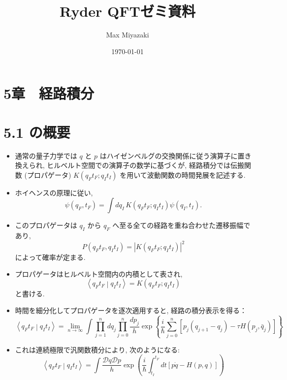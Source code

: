 \documentclass[a4paper,12pt]{article}
\title{Ryder QFTゼミ資料}
\date{\today}
\author{Max Miyazaki}
\newcommand{\braket}[2]{\left\langle #1\middle|#2\right\rangle}
\begin{document}
\maketitle
\section*{\textrm{5章　経路積分}}
\color{blue}
\section*{5.1 の概要}
\begin{itemize}
    \item 通常の量子力学では $q$ と $p$ はハイゼンベルグの交換関係に従う演算子に置き換えられ, ヒルベルト空間での演算子の数学に基づくが, 経路積分では伝搬関数 (プロパゲータ) $K(q_{F}t_{F}; q_{I}t_{I})$ を用いて波動関数の時間発展を記述する.
    \item ホイヘンスの原理に従い,
    \begin{equation*}
        \psi(q_F, t_F) = \int dq_I\, K(q_{F}t_{F}; q_{I}t_{I})\psi(q_I, t_I).
    \end{equation*}
    \item このプロパゲータは $q_I$ から $q_F$ へ至る全ての経路を重ね合わせた遷移振幅であり,
    \begin{equation*}
        P(q_{F}t_{F}, q_{I}t_{I}) = |K(q_{F}t_{F}; q_{I}t_{I})|^2
    \end{equation*}
    によって確率が定まる.
    \item プロパゲータはヒルベルト空間内の内積として表され,
    \begin{equation*}
        \braket{q_{F}t_{F}}{q_{I}t_{I}} = K(q_{F}t_{F}; q_{I}t_{I})
    \end{equation*}
    と書ける.
    \item 時間を細分化してプロパゲータを逐次適用すると, 経路の積分表示を得る：
    \begin{equation*}
        \braket{q_{F}t_{F}}{q_{I}t_{I}} = \lim_{n \rightarrow \infty} \int \prod_{j=1}^{n} dq_{j} \prod_{j=0}^{n}\frac{dp_{j}}{h}\exp\left\{ \frac{i}{\hbar}\sum_{j=0}^{n} [p_{j}(q_{j+1} - q_{j}) - \tau H(p_{j}, \bar{q}_{j})]\right\}
    \end{equation*}
    \item これは連続極限で汎関数積分により, 次のようになる:
    \begin{equation*}
        \braket{q_{F}t_{F}}{q_{I}t_{I}} = \int \frac{\mathcal{D}q\mathcal{D}p}{h}\exp\left(\frac{i}{\hbar}\int_{t_{I}}^{t_{F}} dt [p\dot{q} - H(p, q)] \right)

\end{equation*}
\end{itemize}
\end{document}
